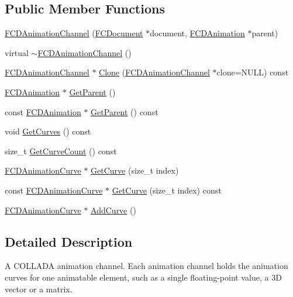 \subsection*{Public Member Functions}
\begin{DoxyCompactItemize}
\item 
\hyperlink{classFCDAnimationChannel_a06b82dde2395bf29253670cd20e6b04c}{FCDAnimationChannel} (\hyperlink{classFCDocument}{FCDocument} $\ast$document, \hyperlink{classFCDAnimation}{FCDAnimation} $\ast$parent)
\item 
virtual \hyperlink{classFCDAnimationChannel_a71b4294f13adc2a0f57be0c3114c0cc9}{$\sim$FCDAnimationChannel} ()
\item 
\hyperlink{classFCDAnimationChannel}{FCDAnimationChannel} $\ast$ \hyperlink{classFCDAnimationChannel_a5736fd5d7dd229bb0d64a26d8ff1f39e}{Clone} (\hyperlink{classFCDAnimationChannel}{FCDAnimationChannel} $\ast$clone=NULL) const 
\item 
\hyperlink{classFCDAnimation}{FCDAnimation} $\ast$ \hyperlink{classFCDAnimationChannel_a208109679a16dec1f0103cbaa7b28324}{GetParent} ()
\item 
const \hyperlink{classFCDAnimation}{FCDAnimation} $\ast$ \hyperlink{classFCDAnimationChannel_a984c713570fdcd79242c2b260df91b0c}{GetParent} () const 
\item 
void \hyperlink{classFCDAnimationChannel_a978b4fceff674c0ae3bda2b5890760a2}{GetCurves} () const 
\item 
size\_\-t \hyperlink{classFCDAnimationChannel_ac1b1e057ebccde60502ea1a12b00f358}{GetCurveCount} () const 
\item 
\hyperlink{classFCDAnimationCurve}{FCDAnimationCurve} $\ast$ \hyperlink{classFCDAnimationChannel_a6022ce6350b29c74b21f253f779739c4}{GetCurve} (size\_\-t index)
\item 
const \hyperlink{classFCDAnimationCurve}{FCDAnimationCurve} $\ast$ \hyperlink{classFCDAnimationChannel_ae6716d448ab360c794901b072e27909c}{GetCurve} (size\_\-t index) const 
\item 
\hyperlink{classFCDAnimationCurve}{FCDAnimationCurve} $\ast$ \hyperlink{classFCDAnimationChannel_ab7d70254bef3270047703746e31522a8}{AddCurve} ()
\end{DoxyCompactItemize}


\subsection{Detailed Description}
A COLLADA animation channel. Each animation channel holds the animation curves for one animatable element, such as a single floating-\/point value, a 3D vector or a matrix.

